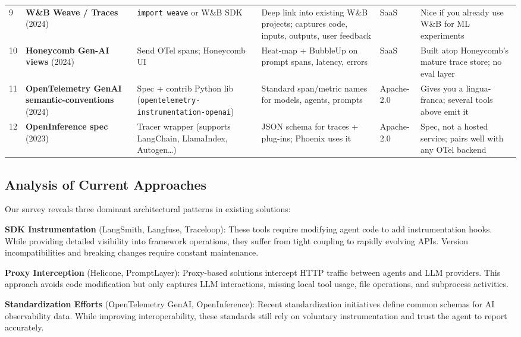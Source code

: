 \documentclass[sigplan,screen，review,9pt]{acmart}
\begin{document}
\begin{table*}[t]
\begin{tabular}{p{0.3cm} p{2.2cm} p{2.5cm} p{2.8cm} p{1.5cm} p{2.2cm}}
9 & \textbf{W\&B Weave / Traces} (2024)~\cite{wandb} & \texttt{import weave} or W\&B SDK & Deep link into existing W\&B projects; captures code, inputs, outputs, user feedback & SaaS & Nice if you already use W\&B for ML experiments \\
10 & \textbf{Honeycomb Gen-AI views} (2024)~\cite{honeycomb} & Send OTel spans; Honeycomb UI & Heat-map + BubbleUp on prompt spans, latency, errors & SaaS & Built atop Honeycomb's mature trace store; no eval layer \\
11 & \textbf{OpenTelemetry GenAI semantic-conventions} (2024)~\cite{semconv} & Spec + contrib Python lib (\texttt{opentelemetry-instrumentation-openai}) & Standard span/metric names for models, agents, prompts & Apache-2.0 & Gives you a lingua-franca; several tools above emit it \\
12 & \textbf{OpenInference spec} (2023)~\cite{openinference} & Tracer wrapper (supports LangChain, LlamaIndex, Autogen…) & JSON schema for traces + plug-ins; Phoenix uses it & Apache-2.0 & Spec, not a hosted service; pairs well with any OTel backend \\
\bottomrule
\end{tabular}
\end{table*}

\subsection{Analysis of Current Approaches}

Our survey reveals three dominant architectural patterns in existing solutions:

\textbf{SDK Instrumentation} (LangSmith, Langfuse, Traceloop): These tools require modifying agent code to add instrumentation hooks. While providing detailed visibility into framework operations, they suffer from tight coupling to rapidly evolving APIs. Version incompatibilities and breaking changes require constant maintenance.

\textbf{Proxy Interception} (Helicone, PromptLayer): Proxy-based solutions intercept HTTP traffic between agents and LLM providers. This approach avoids code modification but only captures LLM interactions, missing local tool usage, file operations, and subprocess activities.

\textbf{Standardization Efforts} (OpenTelemetry GenAI, OpenInference): Recent standardization initiatives define common schemas for AI observability data. While improving interoperability, these standards still rely on voluntary instrumentation and trust the agent to report accurately.
\end{document}
